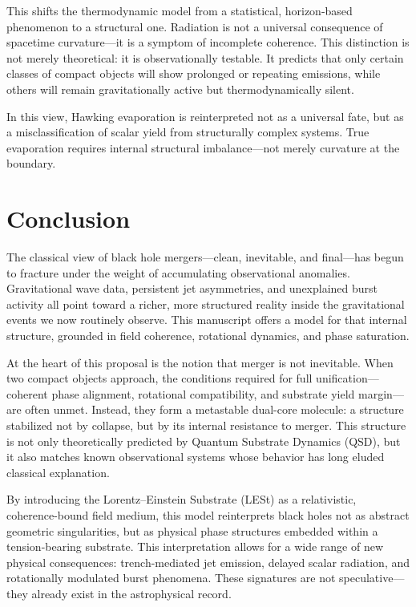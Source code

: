 \documentclass[sn-mathphys]{sn-jnl}
\theoremstyle{thmstyleone}%
\theoremstyle{thmstyletwo}%
\theoremstyle{thmstylethree}%
\begin{document}
This shifts the thermodynamic model from a statistical, horizon-based phenomenon to a structural one. Radiation is not a universal consequence of spacetime curvature—it is a symptom of incomplete coherence. This distinction is not merely theoretical: it is observationally testable. It predicts that only certain classes of compact objects will show prolonged or repeating emissions, while others will remain gravitationally active but thermodynamically silent.

In this view, Hawking\cite{Hawking1975} evaporation is reinterpreted not as a universal fate, but as a misclassification of scalar yield from structurally complex systems. True evaporation requires internal structural imbalance—not merely curvature at the boundary.

\section{Conclusion}

The classical view of black hole mergers—clean, inevitable, and final—has begun to fracture under the weight of accumulating observational anomalies. Gravitational wave data, persistent jet asymmetries, and unexplained burst activity all point toward a richer, more structured reality inside the gravitational events we now routinely observe. This manuscript offers a model for that internal structure, grounded in field coherence, rotational dynamics, and phase saturation.

At the heart of this proposal is the notion that merger is not inevitable. When two compact objects approach, the conditions required for full unification—coherent phase alignment, rotational compatibility, and substrate yield margin—are often unmet. Instead, they form a metastable dual-core molecule: a structure stabilized not by collapse, but by its internal resistance to merger. This structure is not only theoretically predicted by Quantum Substrate Dynamics (QSD), but it also matches known observational systems whose behavior has long eluded classical explanation.

By introducing the Lorentz–Einstein Substrate (LESt) as a relativistic, coherence-bound field medium, this model reinterprets black holes not as abstract geometric singularities, but as physical phase structures embedded within a tension-bearing substrate. This interpretation allows for a wide range of new physical consequences: trench-mediated jet emission, delayed scalar radiation, and rotationally modulated burst phenomena. These signatures are not speculative—they already exist in the astrophysical record.
\end{document}
